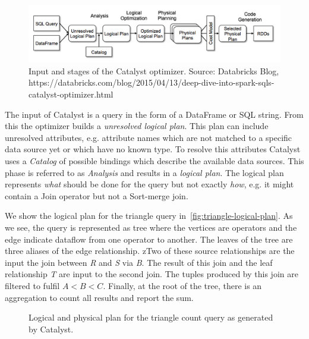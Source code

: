 \begin{figure}
    \includegraphics[width=\textwidth]{figures/catalyst-stages.png}
    \caption{
    Input and stages of the Catalyst optimizer.
    Source: Databricks Blog, https://databricks.com/blog/2015/04/13/deep-dive-into-spark-sqls-catalyst-optimizer.html
    }
    \label{fig:catalyst-stages}
\end{figure}

The input of Catalyst is a query in the form of a DataFrame or SQL string.
From this the optimizer builds a \textit{unresolved logical plan}.
This plan can include unresolved attributes, e.g. attribute names which are not matched to a specific
data source yet or which have no known type.
To resolve this attributes Catalyst uses a \textit{Catalog} of possible bindings which describe the
available data sources.
This phase is referred to as \textit{Analysis} and results in a \textit{logical plan}.
The logical plan represents \textit{what} should be done for the query but not exactly \textit{how},
e.g. it might contain a Join operator but not a Sort-merge join.

We show the logical plan for the triangle query in~\cref{fig:triangle-logical-plan}.
As we see, the query is represented as tree where the vertices are operators and the edge indicate dataflow from
one operator to another.
The leaves of the tree are three aliases of the edge relationship.
zTwo of these source relationships are the input the join between \textit{R} and \textit{S} via \textit{B}.
The result of this join and the leaf relationship \textit{T} are input to the second join.
The tuples produced by this join are filtered to fulfil $A < B < C$.
Finally, at the root of the tree, there is an aggregation to count all results and report the sum.

\begin{figure}
    \centering
    \caption{Logical and physical plan for the triangle count query as generated by Catalyst.}
\end{figure}

